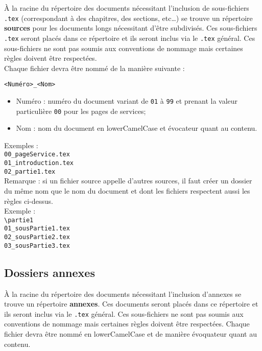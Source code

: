 \`{A} la racine du répertoire des documents nécessitant l'inclusion de sous-fichiers \verb+.tex+
(correspondant à des chapitres, des sections, etc\dots) se trouve un répertoire \textbf{sources} pour
les documents longs nécessitant d'être subdivisés. 
Ces sous-fichiers \verb+.tex+ seront placés dans ce répertoire et ils seront inclus via
le \verb+.tex+ général. Ces sous-fichiers ne sont pas soumis aux conventions de nommage mais certaines règles doivent être respectées.\\
Chaque fichier devra être nommé de la manière suivante :
\begin{center}
\verb+<Numéro>_<Nom>+
\end{center}
\begin{itemize} 
\item Numéro : numéro du document variant de \verb+01+ à \verb+99+ et prenant la valeur particulière \verb+00+ pour les pages de services;
\item Nom : nom du document en lowerCamelCase et évocateur quant au contenu.\\
\end{itemize}
Exemples : \\
\verb+00_pageService.tex+\\
\verb+01_introduction.tex+\\
\verb+02_partie1.tex+\\

Remarque : si un fichier source appelle d'autres sources, il faut créer un dossier du même nom que le nom du document et dont les fichiers respectent aussi les règles ci-dessus.\\
Exemple : \\
\verb+\partie1+\\
\hspace*{1cm} \verb+01_sousPartie1.tex+\\
\hspace*{1cm} \verb+02_sousPartie2.tex+\\
\hspace*{1cm} \verb+03_sousPartie3.tex+\\

\subsection{Dossiers annexes}

\`{A} la racine du répertoire des documents nécessitant l'inclusion d'annexes se trouve un répertoire \textbf{annexes}.
Ces documents seront placés dans ce répertoire et ils seront inclus via
le \verb+.tex+ général. Ces sous-fichiers ne sont pas soumis aux conventions de nommage mais certaines règles doivent être respectées. Chaque fichier devra être nommé en lowerCamelCase et de manière évoquateur quant au contenu. 


